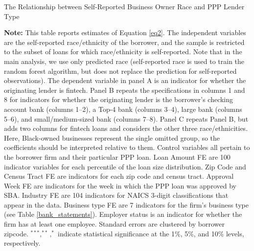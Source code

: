 \documentclass[11pt]{article}
\begin{document}
\newpage
\begin{table}[H]
	\caption{The Relationship between Self-Reported Business Owner Race and PPP Lender Type} \label{regs_selfid_racefintech_fe}
	\begin{adjustbox}{width=\linewidth}
		
	\end{adjustbox}
	
	\begin{adjustbox}{width=\linewidth}
		
	\end{adjustbox}
\end{table}
\begin{landscape}
    \begin{table}[H]
        \begin{adjustbox}{width=\linewidth, center}
            
        \end{adjustbox}
        \begin{minipage}{\linewidth} \medskip
            \footnotesize{{\bf Note: }This table reports estimates of Equation \ref{eq2}. The independent variables are the self-reported race/ethnicity of the borrower, and the sample is restricted to the subset of loans for which race/ethnicity is self-reported. Note that in the main analysis, we use only predicted race (self-reported race is used to train the random forest algorithm, but does not replace the prediction for self-reported observations). The dependent variable in panel A is an indicator for whether the originating lender is fintech. Panel B repeats the specifications in columns 1 and 8 for indicators for whether the originating lender is the borrower's checking account bank (columns 1--2), a Top-4 bank (columns 3--4), large bank (columns 5--6), and small/medium-sized bank (columns 7--8). Panel C repeats Panel B, but adds two columns for fintech loans and considers the other three race/ethnicities. Here, Black-owned businesses represent the single omitted group, so the coefficients should be interpreted relative to them. Control variables all pertain to the borrower firm and their particular PPP loan. Loan Amount FE are 100 indicator variables for each percentile of the loan size distribution. Zip Code and Census Tract FE are indicators for each zip code and census tract. Approval Week FE are indicators for the week in which the PPP loan was approved by SBA. Industry FE are 104 indicators for NAICS 3-digit classifications that appear in the data. Business type FE are 7 indicators for the firm's business type (see Table \ref{bank_statements}). Employer status is an indicator for whether the firm has at least one employee. Standard errors are clustered by borrower zipcode. $^{***}, ^{**}, ^{*}$ indicate statistical significance at the 1\%, 5\%, and 10\% levels, respectively.}
        \end{minipage}
    \end{table}
\end{landscape}
\end{document}
